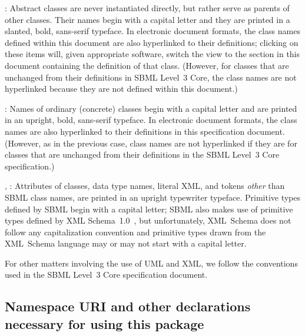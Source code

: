 \documentclass[draftspec]{sbmlpkgspec}
\begin{document}
\begin{description}
  
\item {}: Abstract classes are never
  instantiated directly, but rather serve as parents of other classes.
  Their names begin with a capital letter and they are printed in a
  slanted, bold, sans-serif typeface.  In electronic document formats,
  the class names defined within this document are also hyperlinked to
  their definitions; clicking on these items will, given appropriate
  software, switch the view to the section in this document containing
  the definition of that class.  (However, for classes that are
  unchanged from their definitions in SBML Level~3 Core, the class names
  are not hyperlinked because they are not defined within this
  document.)
  
\item {}: Names of ordinary (concrete) classes begin with a
  capital letter and are printed in an upright, bold, sans-serif
  typeface.  In electronic document formats, the class names are also
  hyperlinked to their definitions in this specification document.
  (However, as in the previous case, class names are not hyperlinked if
  they are for classes that are unchanged from their definitions in the
  SBML Level~3 Core specification.)

\item {}, : Attributes of classes, data
  type names, literal XML, and tokens \emph{other} than SBML class
  names, are printed in an upright typewriter typeface.  Primitive types
  defined by SBML begin with a capital letter; SBML also makes use of
  primitive types defined by XML
  Schema~1.0~\citep{biron:2000,fallside:2000,thompson:2000}, but
  unfortunately, XML~Schema does not follow any capitalization
  convention and primitive types drawn from the XML~Schema language may
  or may not start with a capital letter.

\end{description}

For other matters involving the use of UML and XML, we follow the
conventions used in the SBML Level~3 Core specification document.  


\subsection{Namespace URI and other declarations necessary for using this package}
\label{xml-namespace}
\end{document}
